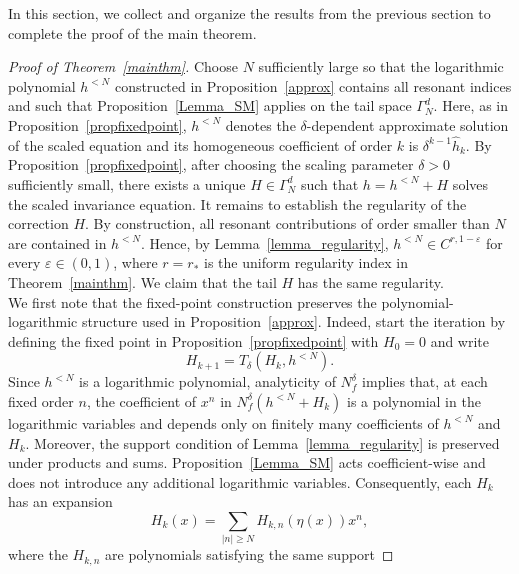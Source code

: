 \documentclass{amsart}
\theoremstyle{plain}
\theoremstyle{definition}
\begin{document}
In this section, we collect and organize the results from the previous section to complete the proof of the main theorem.  \\





\begin{proof}[Proof of Theorem~\ref{mainthm}]
Choose $N$ sufficiently large so that the logarithmic polynomial
$h^{<N}$ constructed in Proposition~\ref{approx}
contains all resonant indices and such that Proposition~\ref{Lemma_SM}
applies on the tail space $\Gamma_N^d$.
Here, as in Proposition~\ref{propfixedpoint}, $h^{<N}$ denotes the $\delta$-dependent approximate solution of the scaled equation and its homogeneous coefficient of order $k$ is $\delta^{k-1}\widehat h_k$. By Proposition~\ref{propfixedpoint}, after choosing the scaling parameter
$\delta>0$ sufficiently small, there exists a unique
$H\in\Gamma_N^d$ such that $h=h^{<N}+H$ solves the scaled invariance equation. It remains to establish the regularity of the correction $H$. By
construction, all resonant contributions of order smaller than $N$
are contained in $h^{<N}$. Hence, by
Lemma~\ref{lemma_regularity},
$h^{<N}\in C^{r,1-\varepsilon}$ for every
$\varepsilon\in(0,1)$, where $r=r_*$ is the uniform regularity index in Theorem~\ref{mainthm}. We claim that the tail $H$ has the same
regularity.\\
We first note that the fixed-point construction preserves the
polynomial-logarithmic structure used in Proposition~\ref{approx}.
Indeed, start the iteration by defining the fixed point in
Proposition~\ref{propfixedpoint} with $H_0=0$ and write
\begin{equation}
    H_{k+1}
    =
    T_\delta(H_k,h^{<N}).
\end{equation}
Since $h^{<N}$ is a logarithmic polynomial, analyticity of
$N_f^\delta$ implies that, at each fixed order $n$, the coefficient
of $x^n$ in $N_f^\delta(h^{<N}+H_k)$ is a polynomial in the
logarithmic variables and depends only on finitely many coefficients
of $h^{<N}$ and $H_k$. Moreover, the support condition of
Lemma~\ref{lemma_regularity} is preserved under products and sums.
Proposition~\ref{Lemma_SM} acts coefficient-wise and does not
introduce any additional logarithmic variables. Consequently, each
$H_k$ has an expansion
\begin{equation}
    H_k(x)
    =
    \sum_{|n|\geq N} H_{k,n}(\eta(x))x^n,
    \label{polynomial-tail-iterates}
\end{equation}
where the $H_{k,n}$ are polynomials satisfying the same support

\end{proof}
\end{document}
